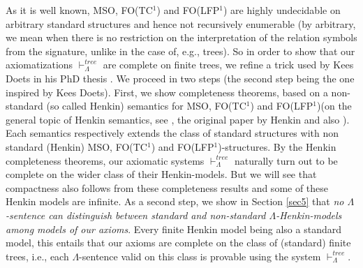 \documentclass{LMCS}
\newcommand{\mso}{\textsf{MSO}\xspace}
\newcommand{\fotc}{\textsf{FO(TC$^1$)}\xspace}
\newcommand{\folfp}{\textsf{FO(LFP$^1$)}\xspace}
\begin{document}
As it is well known, \mso, \fotc and \folfp are highly undecidable on arbitrary standard
structures and hence not recursively enumerable (by arbitrary, we mean 
when there is no restriction on the interpretation of the relation
symbols  from the signature, unlike in the case of, e.g., trees). 
So in order to show that our axiomatizations $\vdash_\Lambda^{tree}$ are complete on finite trees, we refine a trick used by
Kees Doets in his PhD thesis \cite{1987}. We proceed in two steps (the second step being the one inspired by Kees Doets). First, we
show completeness theorems, based on a non-standard (so
called Henkin) semantics for \mso, \fotc and \folfp (on the general topic of Henkin semantics, see \cite{1950}, the original paper by Henkin and also \cite{230876}). Each
semantics respectively extends the class of standard structures with
non standard (Henkin) \mso, \fotc and \folfp-structures. By the
Henkin completeness theorems, our axiomatic systems
$\vdash_\Lambda^{tree}$ naturally turn out to be complete on the
wider class of their Henkin-models. But we will see that compactness also follows from these completeness results and some of these Henkin
models are infinite. As a second step, we show in Section \ref{sec5} that \emph{no
$\Lambda$-sentence can distinguish between standard and non-standard $\Lambda$-Henkin-models among models of our axioms}. Every finite Henkin model being also a standard model, this entails that our axioms are complete on the class of (standard) finite trees, i.e., each $\Lambda$-sentence valid on this class is provable using the system
$\vdash_\Lambda^{tree}$. 
\end{document}
